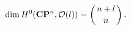 \begin{equation}
{\rm dim}\,H^0({\bf CP}^n, {\cal O}(l))=\left({n+l\atop n}\right).
\label{jjoo}
\end{equation}

